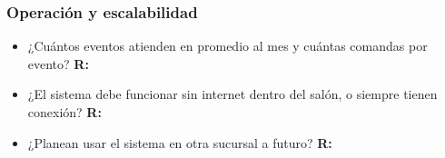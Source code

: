 \subsubsection{Operación y escalabilidad}

\begin{itemize}
    \item ¿Cuántos eventos atienden en promedio al mes y cuántas comandas por evento?
    \subitem \textbf{R:}

    \item ¿El sistema debe funcionar sin internet dentro del salón, o siempre tienen conexión?
    \subitem \textbf{R:}

    \item ¿Planean usar el sistema en otra sucursal a futuro?
    \subitem \textbf{R:}
\end{itemize}
